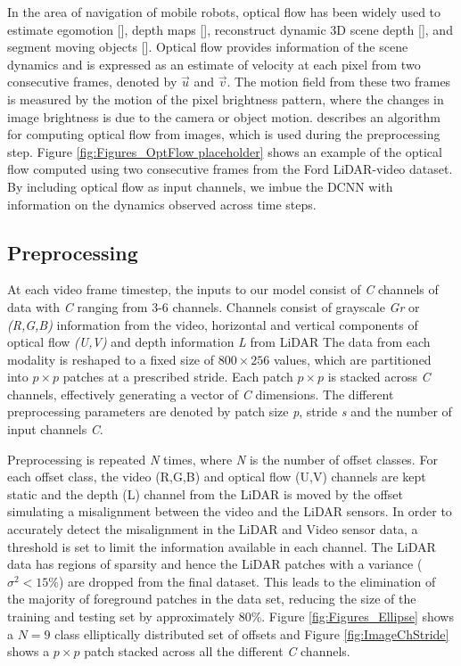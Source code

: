 \documentclass{article}
\begin{document}
In the area of navigation of mobile robots, optical flow has been widely used to estimate egomotion [\cite{Prazdny1980-egomotion-OF}], depth maps [\cite{Shahraray1988-depthestimation-OF}], reconstruct dynamic 3D scene depth [\cite{Yang2012-reconstruction-OF}], and segment moving objects [\cite{Shao2002-seg-OF}]. Optical flow provides information of the scene dynamics and is expressed as an estimate of velocity at each pixel from two consecutive frames, denoted by $\vec{u}$ and $\vec{v}$. The motion field from these two frames is measured by the motion of the pixel brightness pattern, where the changes in image brightness is due to the camera or object motion. \cite{Liu2009Beyond-Pix} describes an algorithm for computing optical flow from images, which is used during the preprocessing step. Figure \ref{fig:Figures_OptFlow placeholder} shows an example of the optical flow computed using two consecutive frames from the Ford LiDAR-video dataset. By including optical flow as input channels, we imbue the DCNN with information on the dynamics observed across time steps.


\subsection{Preprocessing} %
\label{sub:preprocessing}
At each video frame timestep, the inputs to our model consist of \emph{C} channels of data with \emph{C} ranging from 3-6 channels. Channels consist of grayscale \emph{Gr} or \emph{(R,G,B)} information from the video, horizontal and vertical components of optical flow \emph{(U,V)} and depth information \emph{L} from LiDAR The data from each modality is reshaped to a fixed size of $800\times256$ values, which are partitioned into $p\times p$ patches at a prescribed stride. Each patch $p\times p$ is stacked across \emph{C} channels, effectively generating a vector of \emph{C} dimensions. The different preprocessing parameters are denoted by patch size \emph{p}, stride \emph{s} and the number of input channels \emph{C}.

Preprocessing is repeated \emph{N} times, where \emph{N} is the number of offset classes. For each offset class, the video (R,G,B) and optical flow (U,V) channels are kept static and the depth (L) channel from the LiDAR is moved by the offset simulating a misalignment between the video and the LiDAR sensors. In order to accurately detect the misalignment in the LiDAR and Video sensor data, a threshold is set to limit the information available in each channel. The LiDAR data has regions of sparsity and hence the LiDAR patches with a variance (${\sigma}^2 < 15\%$) are dropped from the final dataset. This leads to the elimination of the majority of foreground patches in the data set, reducing the size of the training and testing set by approximately 80\%. Figure \ref{fig:Figures_Ellipse} shows a $N = 9$ class elliptically distributed set of offsets and Figure \ref{fig:ImageChStride} shows a $p\times p$ patch stacked across all the different \emph{C} channels.
\end{document}
